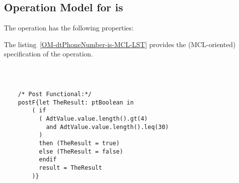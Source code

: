 \subsection{Operation Model for is}

\label{OM-is}


The  operation has the following properties:

	\begin{operationmodel}



		


	\end{operationmodel}



	\vspace{1cm}
	The listing~\ref{OM-dtPhoneNumber-is-MCL-LST} provides the \msrmessir (MCL-oriented) specification of the operation.
	
	\scriptsize
	\vspace{0.5cm}
	\begin{lstlisting}[style=MessirStyle,firstnumber=auto,captionpos=b,caption={\msrmessir (MCL-oriented) specification of the operation \emph{is}.},label=OM-dtPhoneNumber-is-MCL-LST]

	
	
	/* Post Functional:*/ 
	postF{let TheResult: ptBoolean in
	    ( if
	      ( AdtValue.value.length().gt(4)
	        and AdtValue.value.length().leq(30)
	      )
	      then (TheResult = true)
	      else (TheResult = false)
	      endif
	      result = TheResult
	    )}
	
	
	\end{lstlisting}
	\normalsize 
	
	
	
	





